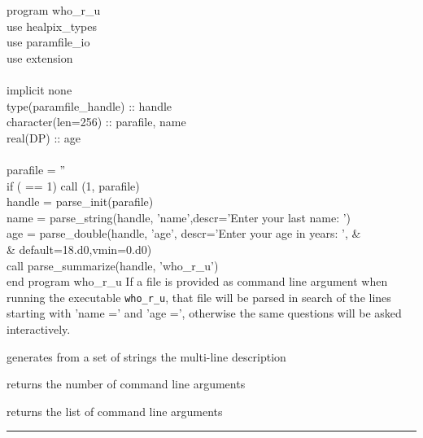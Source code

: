 \begin{example}
{
program who\_r\_u \\
use healpix\_types \\
use paramfile\_io \\
use extension \\
\\
implicit none \\
type(paramfile\_handle) :: handle \\
character(len=256) :: parafile, name \\
real(DP) :: age \\
\\
parafile = ''  \\
if ( == 1) call (1, parafile)  \\
handle = parse\_init(parafile)  \\
name  = parse\_string(handle, 'name',descr='Enter your last name: ')  \\
age   = parse\_double(handle, 'age', descr='Enter your age in years: ', \&   \\
   \& default=18.d0,vmin=0.d0)  \\
call parse\_summarize(handle, 'who\_r\_u')  \\
end program who\_r\_u 
}
{If a file is provided as command line argument when running the executable {\tt who\_r\_u}, that file
  will be parsed in search of the lines starting with 'name =' and 'age =',
  otherwise the same questions will be asked interactively.
}
\end{example}

\begin{related}
  \begin{sulist}{} %
  \item[\htmlref{concatnl}{sub:concatnl}] generates from a set of strings the
  multi-line description
  \item[\htmlref{nArguments}{sub:narguments}] returns the number of
  command line arguments
  \item[\htmlref{getArgument}{sub:getargument}] returns the list of command line arguments
  \end{sulist}
\end{related}

\rule{\hsize}{2mm}

\newpage
